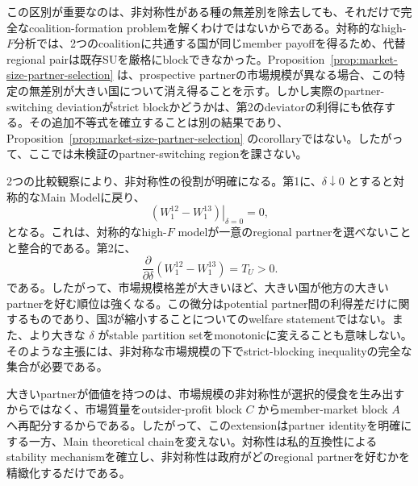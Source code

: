 この区別が重要なのは、非対称性がある種の無差別を除去しても、それだけで完全なcoalition-formation problemを解くわけではないからである。対称的なhigh-$F$分析では、2つのcoalitionに共通する国が同じmember payoffを得るため、代替regional pairは既存SUを厳格にblockできなかった。Proposition~\ref{prop:market-size-partner-selection} は、prospective partnerの市場規模が異なる場合、この特定の無差別が大きい国について消え得ることを示す。しかし実際のpartner-switching deviationがstrict blockかどうかは、第2のdeviatorの利得にも依存する。その追加不等式を確立することは別の結果であり、Proposition~\ref{prop:market-size-partner-selection} のcorollaryではない。したがって、ここでは未検証のpartner-switching regionを課さない。

2つの比較観察により、非対称性の役割が明確になる。第1に、$\delta\downarrow0$ とすると対称的なMain Modelに戻り、
\begin{equation}
    \left.(W_1^{12}-W_1^{13})\right|_{\delta=0}=0,
    \label{eq:delta-symmetry-restoration}
\end{equation}
となる。これは、対称的なhigh-$F$ modelが一意のregional partnerを選べないことと整合的である。第2に、
\begin{equation}
    \frac{\partial}{\partial\delta}
    \left(W_1^{12}-W_1^{13}\right)
    =T_U>0.
    \label{eq:delta-partner-comparative-static}
\end{equation}
である。したがって、市場規模格差が大きいほど、大きい国が他方の大きいpartnerを好む順位は強くなる。この微分はpotential partner間の利得差だけに関するものであり、国3が縮小することについてのwelfare statementではない。また、より大きな $\delta$ がstable partition setをmonotonicに変えることも意味しない。そのような主張には、非対称な市場規模の下でstrict-blocking inequalityの完全な集合が必要である。

大きいpartnerが価値を持つのは、市場規模の非対称性が選択的侵食を生み出すからではなく、市場質量をoutsider-profit block $C$ からmember-market block $A$ へ再配分するからである。したがって、このextensionはpartner identityを明確にする一方、Main theoretical chainを変えない。対称性は私的互換性によるstability mechanismを確立し、非対称性は政府がどのregional partnerを好むかを精緻化するだけである。
